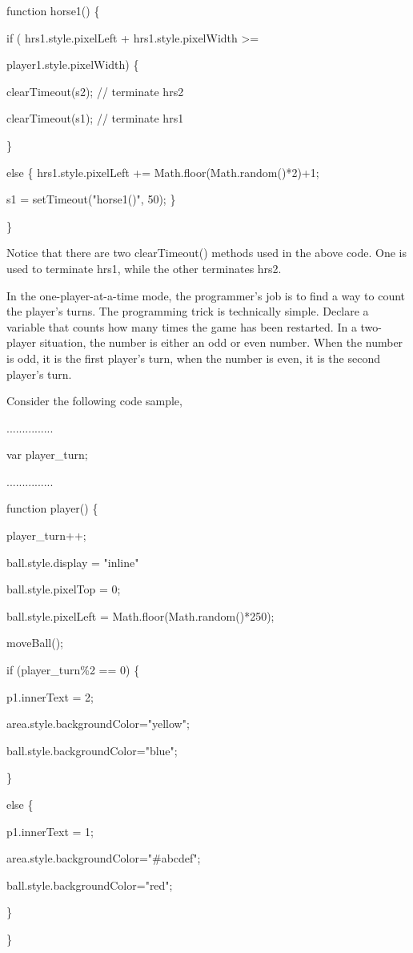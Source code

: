 \documentclass[
]{article}
\begin{document}
function horse1() \{

if ( hrs1.style.pixelLeft + hrs1.style.pixelWidth \textgreater=

player1.style.pixelWidth) \{

clearTimeout(s2); // terminate hrs2

clearTimeout(s1); // terminate hrs1

\}

else \{ hrs1.style.pixelLeft += Math.floor(Math.random()*2)+1;

s1 = setTimeout("horse1()", 50); \}

\}

Notice that there are two clearTimeout() methods used in the above code.
One is used to terminate hrs1, while the other terminates hrs2.

In the one-player-at-a-time mode, the programmer's job is to find a way
to count the player's turns. The programming trick is technically
simple. Declare a variable that counts how many times the game has been
restarted. In a two-player situation, the number is either an odd or
even number. When the number is odd, it is the first player's turn, when
the number is even, it is the second player's turn.

Consider the following code sample,

...............

var player\_turn;

...............

function player() \{

player\_turn++;

ball.style.display = "inline"

ball.style.pixelTop = 0;

ball.style.pixelLeft = Math.floor(Math.random()*250);

moveBall();

if (player\_turn\%2 == 0) \{

p1.innerText = 2;

area.style.backgroundColor="yellow";

ball.style.backgroundColor="blue";

\}

else \{

p1.innerText = 1;

area.style.backgroundColor="\#abcdef";

ball.style.backgroundColor="red";

\}

\}
\end{document}
